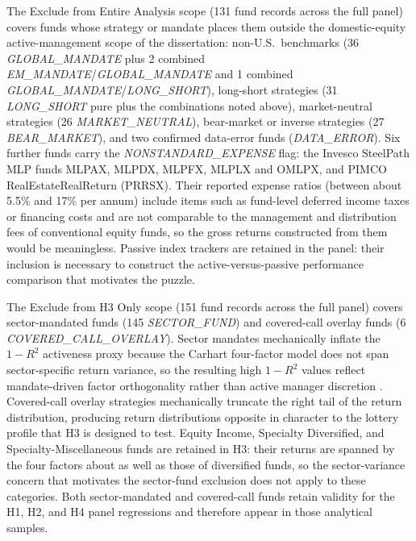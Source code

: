 \documentclass[12pt, oneside]{report}
\newcommand{\flag}[1]{\textit{#1}}
\newcommand{\slashbreak}{\allowbreak/\allowbreak}
\begin{document}
The Exclude from Entire Analysis scope (131 fund records
across the full panel) covers funds whose strategy or mandate places 
them outside the domestic-equity active-management scope of the dissertation:
non-U.S.\ benchmarks (36 \flag{GLOBAL\_MANDATE} plus 2 combined
\flag{EM\_MANDATE}\slashbreak\flag{GLOBAL\_MANDATE} and 1 combined
\flag{GLOBAL\_MANDATE}\slashbreak\flag{LONG\_SHORT}), long-short
strategies (31 \flag{LONG\_SHORT} pure plus the combinations noted
above), market-neutral strategies (26 \flag{MARKET\_NEUTRAL}),
bear-market or inverse strategies (27 \flag{BEAR\_MARKET}), and
two confirmed data-error funds (\flag{DATA\_ERROR}). Six further
funds carry the \flag{NONSTANDARD\_EXPENSE} flag: the Invesco SteelPath
MLP funds MLPAX, MLPDX, MLPFX, MLPLX and OMLPX, and PIMCO
RealEstateRealReturn (PRRSX). Their reported expense ratios (between
about 5.5\% and 17\% per annum) include items such as fund-level deferred
income taxes or financing costs and are not comparable to the
management and distribution fees of conventional equity funds, so the
gross returns constructed from them would be meaningless.
Passive index trackers are retained in the panel: their inclusion
is necessary to construct the active-versus-passive performance
comparison that motivates the puzzle.

The Exclude from H3 Only scope (151 fund records across
the full panel) covers
sector-mandated funds (145 \flag{SECTOR\_FUND}) and covered-call
overlay funds (6 \flag{COVERED\_CALL\_OVERLAY}). Sector mandates
mechanically inflate the $1-R^2$ activeness proxy because the
Carhart four-factor model does not span sector-specific return
variance, so the resulting high $1-R^2$ values reflect
mandate-driven factor orthogonality rather than active manager
discretion \parencite{KacperczykSialmZheng2008}. Covered-call
overlay strategies mechanically truncate the right tail of the
return distribution, producing return distributions opposite in
character to the lottery profile that H3 is designed to test.
Equity Income, Specialty Diversified, and Specialty-Miscellaneous
funds are retained in H3: their returns are spanned by the four factors
about as well as those of diversified funds, so the sector-variance
concern that motivates the sector-fund exclusion does not apply to these
categories. Both sector-mandated
and covered-call funds retain validity for the H1, H2, and H4
panel regressions and therefore appear in those analytical samples.
\end{document}
